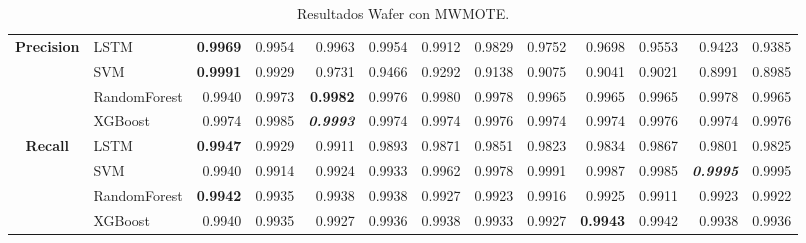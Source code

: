 \begin{table}[H]
\begin{adjustbox}{max width=12cm}
\begin{tabular}{|c|l|r|r|r|r|r|r|r|r|r|r|r|}
			\hline
			\textbf{Precision} &  LSTM & \textbf{  0.9969 } &  0.9954 &  0.9963 &  0.9954 &  0.9912 &  0.9829 &  0.9752 &  0.9698 &  0.9553 &  0.9423 &  0.9385 \\
			&  SVM & \textbf{  0.9991 } &  0.9929 &  0.9731 &  0.9466 &  0.9292 &  0.9138 &  0.9075 &  0.9041 &  0.9021 &  0.8991 &  0.8985 \\
			&  RandomForest &  0.9940 &  0.9973 & \textbf{  0.9982 } &  0.9976 &  0.9980 &  0.9978 &  0.9965 &  0.9965 &  0.9965 &  0.9978 &  0.9965 \\
			&  XGBoost &  0.9974 &  0.9985 & \textit{ \textbf{  0.9993 } } &  0.9974 &  0.9974 &  0.9976 &  0.9974 &  0.9974 &  0.9976 &  0.9974 &  0.9976 \\
			\hline
			\textbf{Recall} &  LSTM & \textbf{  0.9947 } &  0.9929 &  0.9911 &  0.9893 &  0.9871 &  0.9851 &  0.9823 &  0.9834 &  0.9867 &  0.9801 &  0.9825 \\
			&  SVM &  0.9940 &  0.9914 &  0.9924 &  0.9933 &  0.9962 &  0.9978 &  0.9991 &  0.9987 &  0.9985 & \textit{ \textbf{  0.9995 } } &  0.9995 \\
			&  RandomForest & \textbf{  0.9942 } &  0.9935 &  0.9938 &  0.9938 &  0.9927 &  0.9923 &  0.9916 &  0.9925 &  0.9911 &  0.9923 &  0.9922 \\
			&  XGBoost &  0.9940 &  0.9935 &  0.9927 &  0.9936 &  0.9938 &  0.9933 &  0.9927 & \textbf{  0.9943 } &  0.9942 &  0.9938 &  0.9936 \\
			\hline
		\end{tabular}
	\end{adjustbox}
	\caption{Resultados Wafer con MWMOTE.}
	\label{tab:Wafer_MWMOTE}
\end{table}

